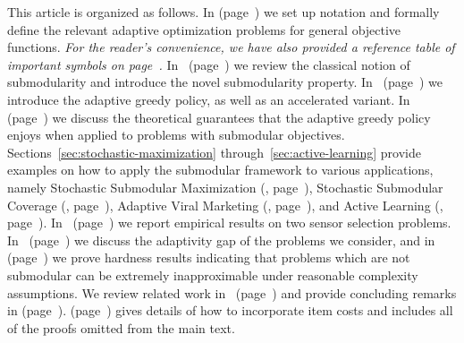  This article is organized as follows.
In  (page~\pageref{sec:problem-statment}) we set up notation and formally define
the relevant adaptive optimization problems for general objective
functions. 
\emph{For the reader's convenience, we have also provided a reference table of
important symbols on page~\pageref{table:symbol-table}.}
In~ (page~\pageref{sec:term-submodularity}) we review the classical notion of submodularity and introduce the novel 
\term submodularity property.  In~
(page~\pageref{sec:the-greedy-policy}) we introduce
the adaptive greedy policy, as well as an accelerated variant.
In~ (page~\pageref{sec:greedy}) we discuss the theoretical guarantees
that the adaptive greedy policy enjoys when applied to 
problems with \term submodular objectives.
Sections~\ref{sec:stochastic-maximization} through~\ref{sec:active-learning}
provide examples on how to apply the \term submodular framework to
various applications, namely Stochastic Submodular Maximization
(, page~\pageref{sec:stochastic-maximization}), Stochastic Submodular Coverage
(, page~\pageref{sec:stochastic-set-cover}), 
Adaptive Viral Marketing (, page~\pageref{sec:viral-marketing}), and 
Active Learning (, page~\pageref{sec:active-learning}).
In~ (page~\pageref{sec:experiments}) we report empirical results on two sensor
selection problems.
In~ (page~\pageref{sec:adaptgap}) we discuss the adaptivity gap of the problems we
consider, and in~ (page~\pageref{sec:hardness}) we prove hardness results
indicating that problems which are not \term submodular  can be extremely
inapproximable under reasonable complexity assumptions.
We review related work in~ (page~\pageref{sec:related-work}) and provide concluding remarks in
 (page~\pageref{sec:conclusions}).  \AppendixA (page~\pageref{sec:proofs}) gives details of how to incorporate item
costs and includes all of the proofs omitted from the main text. 



%
%
%
%
%
